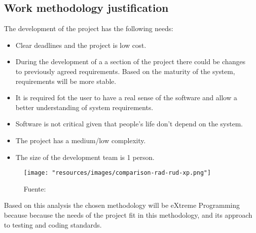 \subsection{Work methodology justification}
\label{sec:methodology-justification}

The development of the project has the following needs:

\begin{itemize}
    \item Clear deadlines and the project is low cost.
    \item During the development of a a section of the project there could be changes to previously agreed requirements.
        Based on the maturity of the system, requirements will be more stable.
    \item It is required fot the  user to have a real sense of the software and allow a better understanding of system requirements. 
    \item Software is not critical given that people's life don't depend on the system.
    \item The project has a medium/low complexity.
    \item The size of the development team is 1 person.
\end{itemize}

\begin{figure}
    \texttt{[image: "resources/images/comparison-rad-rud-xp.png"]}
    \caption{Fuente: \textcite{geambasu2011influence}}\label{fig:comparison-rad-rud-xp}
\end{figure}

Based on this analysis the chosen methodology will be eXtreme Programming because because the needs of the project fit in this methodology, and its approach to testing and coding standards.


